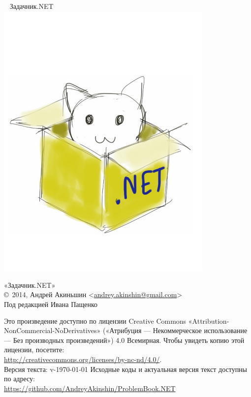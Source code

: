 \begin{center}
~\vspace{4cm}\newline
{\Huge{Задачник.NET}}
\includegraphics[width=0.8\textwidth]{cover}
\end{center}
\newpage

\hbox{}
\vfill
{
\noindent
«Задачник.NET»\\
\copyright\ 2014, Андрей Акиньшин <\href{mailto:andrey.akinshin@gmail.com}{andrey.akinshin@gmail.com}>\\
Под редакцией Ивана Пащенко

\medskip
\noindent
Это произведение доступно по лицензии Creative Commons «Attribution-NonCommercial-NoDerivatives» («Атрибуция — Некоммерческое использование — Без производных произведений») 4.0 Всемирная. Чтобы увидеть копию этой лицензии, посетите:\\ \url{http://creativecommons.org/licenses/by-nc-nd/4.0/}.\\
Версия текста: v-\versiondate\today \newline
Исходные коды и актуальная версия текст доступны по адресу:\\ \url{https://github.com/AndreyAkinshin/ProblemBook.NET}
}
\newpage